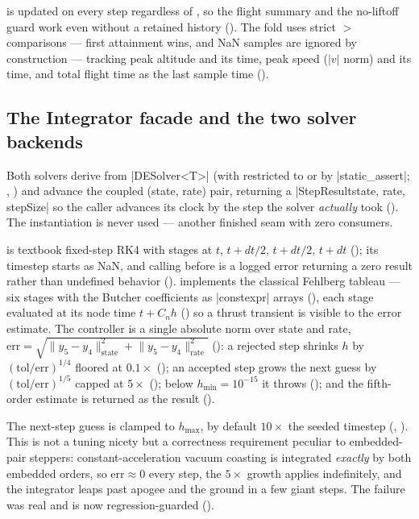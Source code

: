  is updated on every step regardless of , so the
flight summary and the no-liftoff guard work even without a retained history
(). The fold uses strict $>$ comparisons --- first attainment wins,
and NaN samples are ignored by construction --- tracking peak altitude and its time, peak speed
($|v|$ norm) and its time, and total flight time as the last sample time
().

\subsection{The Integrator facade and the two solver backends}\label{sec:sim-solvers}

Both solvers derive from \cppinline|DESolver<T>| (with  restricted to  or
 by \cppinline|static_assert|; ,
) and advance the coupled (state, rate) pair, returning a
\cppinline|StepResult{state, rate, stepSize}| so the caller advances its clock by the step the
solver \emph{actually} took (). The  instantiation is
never used --- another finished seam with zero consumers.

 is textbook fixed-step RK4 with stages at $t$, $t+dt/2$, $t+dt/2$, $t+dt$
(); its timestep starts as NaN, and calling  before
 is a logged error returning a zero result rather than undefined behavior
().  implements the classical Fehlberg tableau --- six
stages with the Butcher coefficients as \cppinline|constexpr| arrays
(), each stage evaluated at its node time $t + C_n h$
() so a thrust transient is visible to the error estimate. The
controller is a single absolute norm over state and rate,
$\mathrm{err}=\sqrt{\lVert y_5 - y_4\rVert^2_{\text{state}}+\lVert y_5 - y_4\rVert^2_{\text{rate}}}$
(): a rejected step shrinks $h$ by $(\mathrm{tol}/\mathrm{err})^{1/4}$
floored at $0.1\times$ (); an accepted step grows the next guess by
$(\mathrm{tol}/\mathrm{err})^{1/5}$ capped at $5\times$ (); below
$h_{\min}=10^{-15}$ it throws (); and the fifth-order estimate is
returned as the result ().

\begin{keyinsight}
The next-step guess is clamped to $h_{\max}$, by default $10\times$ the seeded timestep
(, ). This is not a tuning nicety but a
correctness requirement peculiar to embedded-pair steppers: constant-acceleration vacuum coasting
is integrated \emph{exactly} by both embedded orders, so $\mathrm{err}\approx 0$ every step, the
$5\times$ growth applies indefinitely, and the integrator leaps past apogee and the ground in a
few giant steps. The failure was real and is now regression-guarded
().
\end{keyinsight}

